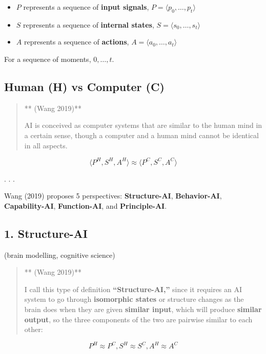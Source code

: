 \documentclass[
  letterpaper,
  DIV=11,
  numbers=noendperiod]{scrartcl}
\providecommand{\tightlist}{%
  \setlength{\itemsep}{0pt}\setlength{\parskip}{0pt}}
\begin{document}
\begin{itemize}
\tightlist
\item
  \(P\) represents a sequence of \textbf{input signals},
  \(P = \langle p_0,\ldots,p_t \rangle\)
\item
  \(S\) represents a sequence of \textbf{internal states},
  \(S = \langle s_0,\ldots,s_t \rangle\)
\item
  \(A\) represents a sequence of \textbf{actions},
  \(A = \langle a_0,\ldots,a_t \rangle\)
\end{itemize}

For a sequence of moments, \(0,\ldots,t\).

\subsection{Human (H) vs Computer (C)}\label{human-h-vs-computer-c}

\begin{quote}
** (Wang 2019)**

AI is conceived as computer systems that are similar to the human mind
in a certain sense, though a computer and a human mind cannot be
identical in all aspects.
\end{quote}

\[
\langle P^H,S^H,A^H \rangle \approx \langle P^C,S^C,A^C \rangle
\]

. . .

Wang (2019) proposes 5 perspectives: \textbf{Structure-AI},
\textbf{Behavior-AI}, \textbf{Capability-AI}, \textbf{Function-AI}, and
\textbf{Principle-AI}.

\subsection{1. Structure-AI}\label{structure-ai}

(brain modelling, cognitive science)

\begin{quote}
** (Wang 2019)**

I call this type of definition \textbf{``Structure-AI,''} since it
requires an AI system to go through \textbf{isomorphic states} or
structure changes as the brain does when they are given \textbf{similar
input}, which will produce \textbf{similar output}, so the three
components of the two are pairwise similar to each other:
\end{quote}

\[
 P^H \approx P^C, S^H \approx S^C, A^H \approx A^C 
\]
\end{document}
